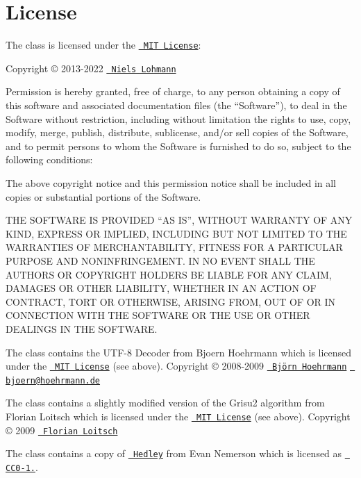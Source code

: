 \chapter{License}
\hypertarget{md_build_2dt__core_2__deps_2nlohmann__json-src_2docs_2mkdocs_2docs_2home_2license}{}\label{md_build_2dt__core_2__deps_2nlohmann__json-src_2docs_2mkdocs_2docs_2home_2license}
\label{md_build_2dt__core_2__deps_2nlohmann__json-src_2docs_2mkdocs_2docs_2home_2license_autotoc_md1562}%
%
 

The class is licensed under the \href{https://opensource.org/licenses/MIT}{\texttt{ MIT License}}\+:

Copyright \copyright{} 2013-\/2022 \href{https://nlohmann.me}{\texttt{ Niels Lohmann}}

Permission is hereby granted, free of charge, to any person obtaining a copy of this software and associated documentation files (the “\+Software”), to deal in the Software without restriction, including without limitation the rights to use, copy, modify, merge, publish, distribute, sublicense, and/or sell copies of the Software, and to permit persons to whom the Software is furnished to do so, subject to the following conditions\+:

The above copyright notice and this permission notice shall be included in all copies or substantial portions of the Software.

THE SOFTWARE IS PROVIDED “\+AS IS”, WITHOUT WARRANTY OF ANY KIND, EXPRESS OR IMPLIED, INCLUDING BUT NOT LIMITED TO THE WARRANTIES OF MERCHANTABILITY, FITNESS FOR A PARTICULAR PURPOSE AND NONINFRINGEMENT. IN NO EVENT SHALL THE AUTHORS OR COPYRIGHT HOLDERS BE LIABLE FOR ANY CLAIM, DAMAGES OR OTHER LIABILITY, WHETHER IN AN ACTION OF CONTRACT, TORT OR OTHERWISE, ARISING FROM, OUT OF OR IN CONNECTION WITH THE SOFTWARE OR THE USE OR OTHER DEALINGS IN THE SOFTWARE.



The class contains the UTF-\/8 Decoder from Bjoern Hoehrmann which is licensed under the \href{https://opensource.org/licenses/MIT}{\texttt{ MIT License}} (see above). Copyright \copyright{} 2008-\/2009 \href{http://bjoern.hoehrmann.de/}{\texttt{ Björn Hoehrmann}} \href{mailto:bjoern@hoehrmann.de}{\texttt{ bjoern@hoehrmann.\+de}}

The class contains a slightly modified version of the Grisu2 algorithm from Florian Loitsch which is licensed under the \href{https://opensource.org/licenses/MIT}{\texttt{ MIT License}} (see above). Copyright \copyright{} 2009 \href{https://florian.loitsch.com/}{\texttt{ Florian Loitsch}}

The class contains a copy of \href{https://nemequ.github.io/hedley/}{\texttt{ Hedley}} from Evan Nemerson which is licensed as \href{https://creativecommons.org/publicdomain/zero/1.0/}{\texttt{ CC0-\/1.}}. 